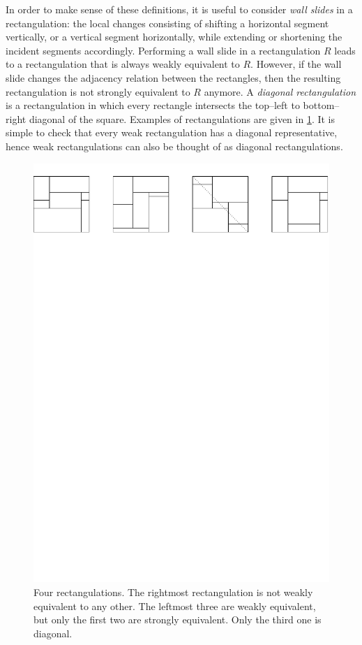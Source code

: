 \documentclass{amsart}
\theoremstyle{definition}
\newcommand{\darkblue}{\color{darkblue}} %
\newcommand{\defn}[1]{\textsl{\darkblue #1}} %
\begin{document}
In order to make sense of these definitions, it is useful to consider \defn{wall slides} in a rectangulation: the local changes consisting of shifting a horizontal segment vertically, or a vertical segment horizontally, while extending or shortening the incident segments accordingly.
Performing a wall slide in a rectangulation $R$ leads to a rectangulation that is always weakly equivalent to $R$.
However, if the wall slide changes the adjacency relation between the rectangles, then the resulting rectangulation is not strongly equivalent to $R$ anymore.
A \defn{diagonal rectangulation} is a rectangulation in which every rectangle intersects the top--left to bottom--right diagonal of the square.
Examples of rectangulations are given in \cref{fig:rectequiv}.
It is simple to check that every weak rectangulation has a diagonal representative, hence weak rectangulations can also be thought of as diagonal rectangulations.

\begin{figure}
  \includegraphics[width=\textwidth]{rectangulations.pdf}
	\caption{Four rectangulations. The rightmost rectangulation is not weakly equivalent to any other. The leftmost three are weakly equivalent, but only the first two are strongly equivalent. Only the third one is diagonal.}
	\label{fig:rectequiv}
\end{figure}
\end{document}
